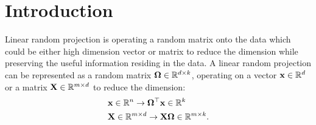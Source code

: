 
\section{Introduction}
Linear random projection is  operating a random matrix onto the data which could be either high dimension vector or matrix to reduce the dimension while preserving the useful information residing in the data. A linear random projection can be represented as a random matrix $\mathbf{\Omega}\in \mathbb{R}^{d\times k}$, operating on a vector $\mathbf{x}\in \mathbb{R}^{d}$ or a matrix $\mathbf{X} \in \mathbb{R}^{m\times d}$ to reduce the dimension:
\begin{equation}
\label{eq:low_dim_mapping}
\begin{aligned}
&\mathbf{x} \in \mathbb{R}^{n} \rightarrow  \mathbf{\Omega}^\top \mathbf{x} \in \mathbb{R}^{k} \\
& \mathbf{X} \in \mathbb{R}^{m\times d} \rightarrow   \mathbf{X}\mathbf{\Omega} \in \mathbb{R}^{m\times k}. 
\end{aligned}
\end{equation}

